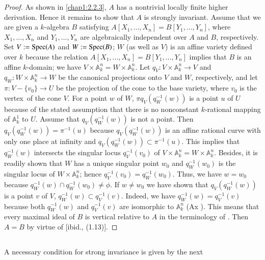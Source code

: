 \begin{proof}
As shown in \ref{chap1:2.2.3}, $A$ has a nontrivial locally finite higher
derivation. Hence it remains to show that $A$ is strongly
invariant. Assume that we are given a $k$-algebra $B$ satisfying
$A[X_{1},\ldots,X_{n}]=B[Y_{1},\ldots,Y_{n}]$, where
$X_{1},\ldots,X_{n}$ and $Y_{1},\ldots,Y_{n}$ are algebraically
independent over $A$ and $B$, respectively. Set $V:=\operatorname{Spec} (A)$ and
$W:=\operatorname{Spec}(B)$; $W$ (as well as $V$) is an affine variety defined over
$k$ because the relation $A[X_{1},\ldots,X_{n}]=B[Y_{1},\ldots,Y_{n}]$
implies that $B$ is an affine $k$-domain; we have $V\times
\mathbb{A}^{n}_{k}=W\times\mathbb{A}^{n}_{k}$. Let $q_{V}:V\times
\mathbb{A}^{n}_{k}\to V$ and $q_{W}:W\times\mathbb{A}^{n}_{k}\to W$ be
the canonical projections onto $V$ and $W$, respectively, and let
$\pi:V-\{v_{0}\}\to U$ be the projection of the cone to the base
variety, where $v_{0}$ is the vertex\pageoriginale\ of the cone
$V$. For a point $w$ of $W$, $\pi q_{V}(q^{-1}_{W}(w))$ is a point $u$
of $U$ because of the stated assumption that there is no nonconstant
$k$-rational mapping of $\mathbb{A}^{1}_{k}$ to $U$. Assume that
$q_{V}(q^{-1}_{W}(w))$ is not a point. Then
$q_{V}(q^{-1}_{W}(w))=\pi^{-1}(u)$ because $q_{V}(q^{-1}_{W}(w))$ is
an affine rational curve with only one place at infinity and
$q_{V}(q^{-1}_{W}(w))\subset \pi^{-1}(u)$. This implies that
$q^{-1}_{W}(w)$ intersects the singular locus $q^{-1}_{V}(v_{0})$ of
$V\times \mathbb{A}^{n}_{k}=W\times\mathbb{A}^{n}_{k}$. Besides, it is
readily shown that $W$ has a unique singular point $w_{0}$ and
$q^{-1}_{W}(w_{0})$ is the singular locus of $W\times
\mathbb{A}^{n}_{k}$; hence
$q^{-1}_{V}(v_{0})=q^{-1}_{W}(w_{0})$. Thus, we have $w=w_{0}$ because
$q^{-1}_{W}(w)\cap q^{-1}_{W}(w_{0})\neq \phi$. If $w\neq w_{0}$ we
have shown that $q_{V}(q^{-1}_{W}(w))$ is a point $v$ of $V$, \iec
$q^{-1}_{W}(w)\subset q^{-1}_{V}(v)$. Indeed, we have
$q^{-1}_{W}(w)=q^{-1}_{V}(v)$ because both $q^{-1}_{W}(w)$ and
$q^{-1}_{V}(v)$ are isomorphic to $\mathbb{A}^{n}_{k}$ (\cf Ax
\cite{8}). This means that every maximal ideal of $B$ is vertical
relative to $A$ in the terminology of \cite{1}. Then $A=B$ by virtue
of [ibid., (1.13)].
\end{proof}

\subsection{}\label{chap1:6.5}
A necessary condition for strong invariance is given by the next

